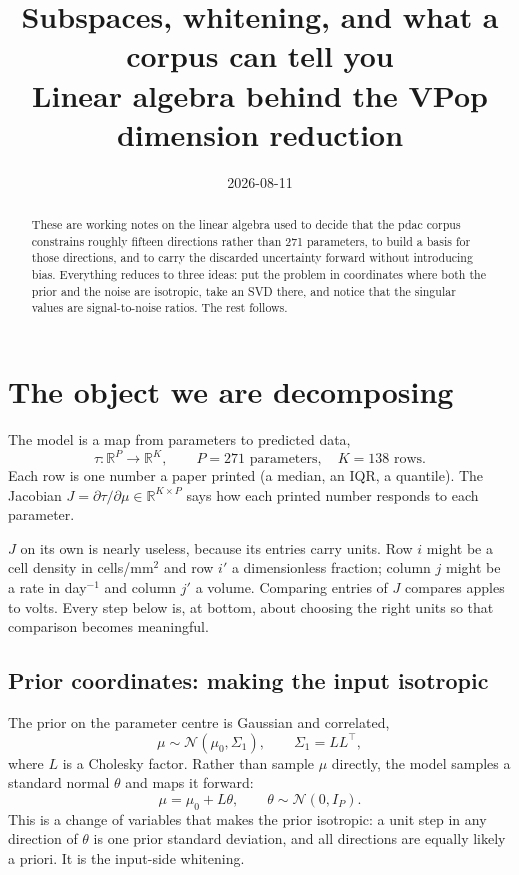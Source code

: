 \documentclass[11pt]{article}
\title{Subspaces, whitening, and what a corpus can tell you\\
\large Linear algebra behind the VPop dimension reduction}
\author{}
\date{2026-08-11}
\newcommand{\R}{\mathbb{R}}
\newcommand{\muraw}{\theta}
\newcommand{\Sig}{\Sigma_1}
\begin{document}
\maketitle

\begin{abstract}
\noindent
These are working notes on the linear algebra used to decide that the pdac
corpus constrains roughly fifteen directions rather than 271 parameters, to
build a basis for those directions, and to carry the discarded uncertainty
forward without introducing bias. Everything reduces to three ideas: put the
problem in coordinates where both the prior and the noise are isotropic, take
an SVD there, and notice that the singular values are signal-to-noise ratios.
The rest follows.
\end{abstract}

\section{The object we are decomposing}

The model is a map from parameters to predicted data,
\[
  \tau : \R^{P} \longrightarrow \R^{K},
  \qquad P = 271 \text{ parameters}, \quad K = 138 \text{ rows}.
\]
Each row is one number a paper printed (a median, an IQR, a quantile). The
Jacobian $J = \partial\tau/\partial\mu \in \R^{K\times P}$ says how each printed
number responds to each parameter.

$J$ on its own is nearly useless, because its entries carry units. Row $i$ might
be a cell density in cells/mm$^2$ and row $i'$ a dimensionless fraction; column
$j$ might be a rate in day$^{-1}$ and column $j'$ a volume. Comparing entries of
$J$ compares apples to volts. Every step below is, at bottom, about choosing the
right units so that comparison becomes meaningful.

\subsection{Prior coordinates: making the input isotropic}

The prior on the parameter centre is Gaussian and correlated,
\[
  \mu \sim \mathcal N(\mu_0, \Sig), \qquad \Sig = L L^{\top},
\]
where $L$ is a Cholesky factor. Rather than sample $\mu$ directly, the model
samples a standard normal $\muraw$ and maps it forward:
\[
  \mu = \mu_0 + L\muraw, \qquad \muraw \sim \mathcal N(0, I_P).
\]
This is a change of variables that makes the prior isotropic: a unit step in any
direction of $\muraw$ is one prior standard deviation, and all directions are
equally likely a priori. It is the input-side whitening.
\end{document}
